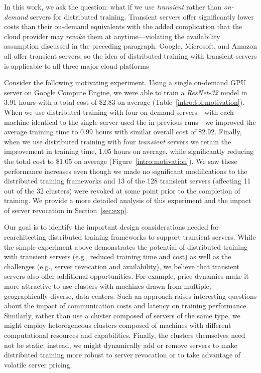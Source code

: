 In this work, we ask the question: what if we use \emph{transient} rather than
\emph{on-demand} servers for distributed training.  Transient servers offer
significantly lower costs than their on-demand equivalents with the added
complication that the cloud provider may \emph{revoke} them at anytime---violating the
availability assumption discussed in the preceding paragraph.  Google,
Microsoft, and Amazon all offer transient servers, so the idea of 
distributed training with transient servers is applicable to all three major
cloud platforms

Consider the following motivating experiment. Using a single on-demand GPU
server on Google Compute Engine, we were able to train a \emph{ResNet-32} model in 3.91 hours
with a total cost of \$2.83 on average (Table~\ref{intro:tbl:motivation}). When we use distributed training with
four on-demand servers---with each machine identical to the single server used 
the in previous runs---we improved the average training time to 0.99 hours
with similar overall cost of \$2.92. Finally, when we use distributed training
with four \emph{transient} servers we retain the improvement in training time,
1.05 hours on average, while significantly reducing the total cost to \$1.05 on
average (Figure~\ref{intro:motivation}). We saw these performance increases even though we made no significant
modifications to the distributed training frameworks and 13 of the 128 transient
servers (affecting 11 out of the 32 clusters) were revoked at some point prior
to the completion of training. We provide a more detailed analysis of this
experiment and the impact of server revocation in Section~\ref{sec:exp}.      

Our goal is to identify the important design considerations needed for
rearchitecting distributed training frameworks to support transient servers.
While the simple experiment above demonstrates the potential of distributed
training with transient servers (e.g., reduced training time and cost) as well
as the challenges (e.g., server revocation and availability), we believe that
transient servers also offer additional opportunities.  For example, price
dynamics make it more attractive to use clusters with machines drawn from
multiple, geographically-diverse, data centers. Such an approach raises
interesting questions about the impact of communication costs and latency on
training performance. Similarly, rather than use a cluster composed of servers 
of the same type,  we might employ heterogeneous clusters composed of machines
with different computational resources and capabilities. Finally, the clusters
themselves need not be static; instead, we might dynamically add or remove
servers to make distributed training more robust to server revocation or to
take advantage of volatile server pricing.   

